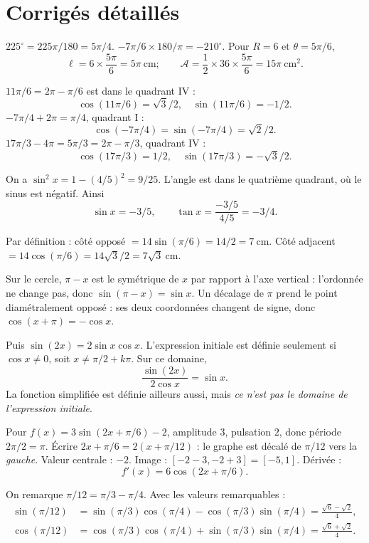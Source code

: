 \chapter{Corrigés détaillés}
\(225^\circ=225\pi/180=\boxed{5\pi/4}\). \(-7\pi/6\times180/\pi=\boxed{-210^\circ}\). Pour \(R=6\) et \(\theta=5\pi/6\),
\[\ell=6\times\frac{5\pi}6=\boxed{5\pi\ \text{cm}};\qquad
\mathcal A=\frac12\times36\times\frac{5\pi}6=\boxed{15\pi\ \text{cm}^2}.\]

\(11\pi/6=2\pi-\pi/6\) est dans le quadrant IV :
\[\boxed{\cos(11\pi/6)=\sqrt3/2,\quad\sin(11\pi/6)=-1/2}.\]
\(-7\pi/4+2\pi=\pi/4\), quadrant I :
\[\boxed{\cos(-7\pi/4)=\sin(-7\pi/4)=\sqrt2/2}.\]
\(17\pi/3-4\pi=5\pi/3=2\pi-\pi/3\), quadrant IV :
\[\boxed{\cos(17\pi/3)=1/2,\quad\sin(17\pi/3)=-\sqrt3/2}.\]

On a \(\sin^2x=1-(4/5)^2=9/25\). L'angle est dans le quatrième quadrant, où le sinus est négatif. Ainsi
\[\boxed{\sin x=-3/5,\qquad \tan x=\frac{-3/5}{4/5}=-3/4}.\]

Par définition : côté opposé \(=14\sin(\pi/6)=14/2=\boxed{7\ \mathrm{cm}}\). Côté adjacent \(=14\cos(\pi/6)=14\sqrt3/2=\boxed{7\sqrt3\ \mathrm{cm}}\).

Sur le cercle, \(\pi-x\) est le symétrique de \(x\) par rapport à l'axe vertical : l'ordonnée ne change pas, donc \(\sin(\pi-x)=\sin x\). Un décalage de \(\pi\) prend le point diamétralement opposé : ses deux coordonnées changent de signe, donc \(\cos(x+\pi)=-\cos x\).

Puis \(\sin(2x)=2\sin x\cos x\). L'expression initiale est définie seulement si \(\cos x\neq0\), soit \(x\neq\pi/2+k\pi\). Sur ce domaine,
\[\boxed{\frac{\sin(2x)}{2\cos x}=\sin x}.\]
La fonction simplifiée est définie ailleurs aussi, mais \emph{ce n'est pas le domaine de l'expression initiale}.

Pour \(f(x)=3\sin(2x+\pi/6)-2\), amplitude \(3\), pulsation \(2\), donc période \(2\pi/2=\boxed{\pi}\). Écrire \(2x+\pi/6=2(x+\pi/12)\) : le graphe est décalé de \(\pi/12\) vers la \emph{gauche}. Valeur centrale : \(-2\). Image : \([-2-3,-2+3]=\boxed{[-5,1]}\). Dérivée :
\[\boxed{f'(x)=6\cos(2x+\pi/6)}.\]

On remarque \(\pi/12=\pi/3-\pi/4\). Avec les valeurs remarquables :
\[\begin{aligned}
\sin(\pi/12)&=\sin(\pi/3)\cos(\pi/4)-\cos(\pi/3)\sin(\pi/4)
=\boxed{\frac{\sqrt6-\sqrt2}{4}},\\
\cos(\pi/12)&=\cos(\pi/3)\cos(\pi/4)+\sin(\pi/3)\sin(\pi/4)
=\boxed{\frac{\sqrt6+\sqrt2}{4}}.
\end{aligned}\]

